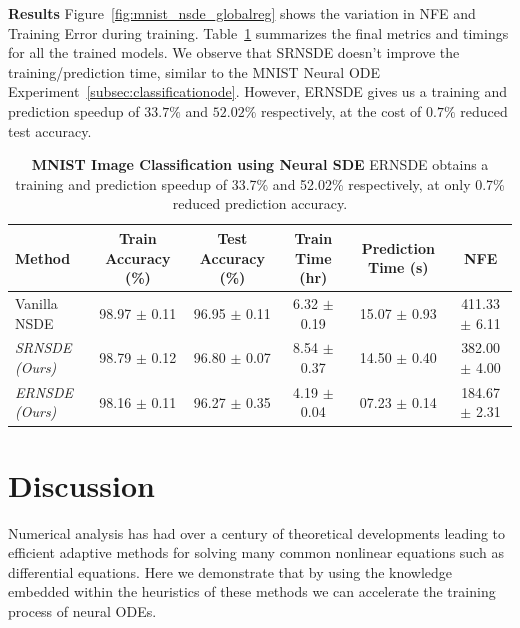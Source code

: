\textbf{Results} Figure~\ref{fig:mnist_nsde_globalreg} shows the variation in NFE and Training Error during training. Table~\ref{tab:mnist_nsde} summarizes the final metrics and timings for all the trained models. We observe that SRNSDE doesn't improve the training/prediction time, similar to the MNIST Neural ODE Experiment~\ref{subsec:classificationode}. However, ERNSDE gives us a training and prediction speedup of $33.7\%$ and $52.02\%$ respectively, at the cost of $0.7\%$ reduced test accuracy.


\begin{table}[t]
  \centering
  \begin{adjustbox}{width=\linewidth,center}
    \begin{tabular}{lccccc}
      \toprule
      \textbf{Method}        & \textbf{Train Accuracy (\%)} & \textbf{Test Accuracy (\%)} & \textbf{Train Time (hr)} & \textbf{Prediction Time (s)} & \textbf{NFE}      \\
      \midrule
      Vanilla NSDE           & 98.97 $\pm$ 0.11             & 96.95 $\pm$ 0.11            & 6.32 $\pm$ 0.19          & 15.07 $\pm$ 0.93             & 411.33 $\pm$ 6.11 \\
      \addlinespace
      \textit{SRNSDE (Ours)} & 98.79 $\pm$ 0.12             & 96.80 $\pm$ 0.07            & 8.54 $\pm$ 0.37          & 14.50 $\pm$ 0.40             & 382.00 $\pm$ 4.00 \\
      \textit{ERNSDE (Ours)} & 98.16 $\pm$ 0.11             & 96.27 $\pm$ 0.35            & 4.19 $\pm$ 0.04          & 07.23 $\pm$ 0.14             & 184.67 $\pm$ 2.31 \\
      \bottomrule
    \end{tabular}
  \end{adjustbox}
  \caption{\textbf{MNIST Image Classification using Neural SDE} ERNSDE obtains a training and prediction speedup of 33.7\% and 52.02\% respectively, at only 0.7\% reduced prediction accuracy.}
  \label{tab:mnist_nsde}
\end{table}

\section{Discussion}
\label{sec:discussion_on_global_regularization_of_neural_des}

Numerical analysis has had over a century of theoretical developments leading to efficient adaptive methods for solving many common nonlinear equations such as differential equations. Here we demonstrate that by using the knowledge embedded within the heuristics of these methods we can accelerate the training process of neural ODEs.

